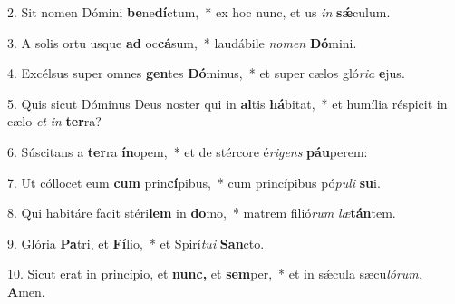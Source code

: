 \item 2. Sit nomen Dómini \textbf{be}ne\textbf{dí}ctum,~* ex hoc nunc, et us\hspace{0.03emque} \textit{in} \textbf{sǽ}culum.
\item 3. A solis ortu usque \textbf{ad} oc\textbf{cá}sum,~* laudábile \textit{nomen} \textbf{Dó}mini.
\item 4. Excélsus super omnes \textbf{gen}tes \textbf{Dó}minus,~* et super cælos gló\textit{ria} \textbf{e}jus.
\item 5. Quis sicut Dóminus Deus noster qui in \textbf{al}tis \textbf{há}bitat,~* et humília réspicit in cælo \textit{et} \textit{in} \textbf{ter}ra?
\item 6. Súscitans a \textbf{ter}ra \textbf{ín}opem,~* et de stércore é\textit{rigens} \textbf{páu}perem:
\item 7. Ut cóllocet eum \textbf{cum} prin\textbf{cí}pibus,~* cum princípibus pó\textit{puli} \textbf{su}i.
\item 8. Qui habitáre facit stéri\textbf{lem} in \textbf{do}mo,~* matrem filió\textit{rum} \textit{læ}\textbf{tán}tem.
\item 9. Glória \textbf{Pa}tri, et \textbf{Fí}lio,~* et Spirí\textit{tui} \textbf{San}cto.
\item 10. Sicut erat in princípio, et \textbf{nunc,} et \textbf{sem}per,~* et in sǽcula sæcu\hspace{0.03em}\textit{lórum.} \textbf{A}men.
